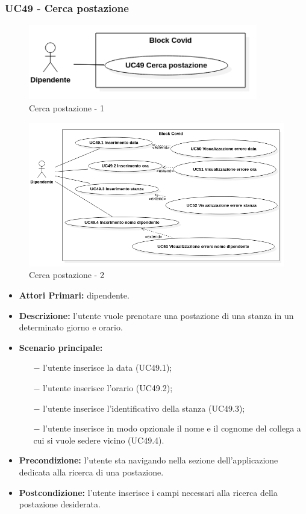 \subsubsection{ UC49 - Cerca postazione}
\begin{figure}[H]
	\centering
	\includegraphics[width=10cm]{res/images/UC49.png}
	\caption{Cerca postazione - 1}
	\label{fig:Cerca postazione - 1}
\end{figure}
\begin{figure}[H]
	\centering
	\includegraphics[width=18cm]{res/images/UC49-50-51-52-53.png}
	\caption{Cerca postazione - 2}
	\label{fig:Cerca postazione - 2}
\end{figure}
\begin{itemize}
	\item\textbf{Attori Primari:} dipendente.
	\item\textbf{Descrizione:} l’utente vuole prenotare una postazione di una stanza in un determinato giorno e orario.
	\item\textbf{Scenario principale:} 
	\begin{itemize}
		\item[$-$] l’utente inserisce la data (UC49.1);
		\item[$-$] l’utente inserisce l'orario (UC49.2);
		\item[$-$] l’utente inserisce l'identificativo della stanza (UC49.3);
		\item[$-$] l’utente inserisce in modo opzionale il nome e il cognome del collega a cui si vuole sedere vicino (UC49.4).
	\end{itemize}
	\item\textbf{Precondizione:} l’utente sta navigando nella sezione dell'applicazione dedicata alla ricerca di una postazione.
	\item\textbf{Postcondizione:} l’utente inserisce i campi necessari alla ricerca della postazione desiderata.
\end{itemize}
